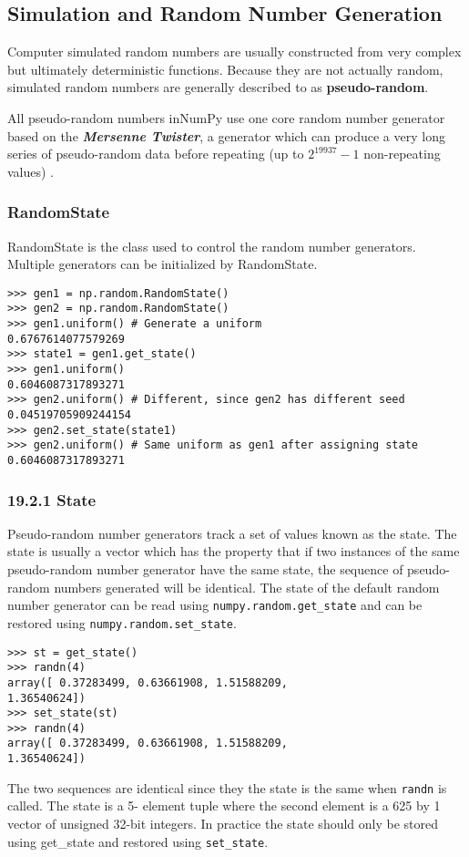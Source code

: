 \documentclass[KSmain.tex]{subfiles}
\begin{document}
\subsection{Simulation and Random Number Generation}
Computer simulated random numbers are usually constructed from very complex but ultimately deterministic
functions. Because they are not actually random, simulated random numbers are generally described
to as \textbf{pseudo-random}. 

All pseudo-random numbers inNumPy use one core random number generator
based on the \textbf{\textit{Mersenne Twister}}, a generator which can produce a very long series of pseudo-random
data before repeating (up to $2^19937 - 1$ non-repeating values)
.
\subsubsection{RandomState}
RandomState is the class used to control the random number generators. Multiple generators can be initialized
by RandomState.
\begin{framed}
\begin{verbatim}
>>> gen1 = np.random.RandomState()
>>> gen2 = np.random.RandomState()
>>> gen1.uniform() # Generate a uniform
0.6767614077579269
>>> state1 = gen1.get_state()
>>> gen1.uniform()
0.6046087317893271
>>> gen2.uniform() # Different, since gen2 has different seed
0.04519705909244154
>>> gen2.set_state(state1)
>>> gen2.uniform() # Same uniform as gen1 after assigning state
0.6046087317893271
\end{verbatim}
\end{framed}
\subsubsection{19.2.1 State}
Pseudo-random number generators track a set of values known as the state. The state is usually a vector
which has the property that if two instances of the same pseudo-random number generator have the
same state, the sequence of pseudo-random numbers generated will be identical. The state of the default
random number generator can be read using \texttt{numpy.random.get\_state} and can be restored using
\texttt{numpy.random.set\_state}.
\begin{framed}
\begin{verbatim}>>> st = get_state()
>>> randn(4)
array([ 0.37283499, 0.63661908, 1.51588209,
1.36540624])
>>> set_state(st)
>>> randn(4)
array([ 0.37283499, 0.63661908, 1.51588209,
1.36540624])
\end{verbatim}
\end{framed}
The two sequences are identical since they the state is the same when \texttt{randn} is called. The state is a 5-
element tuple where the second element is a 625 by 1 vector of unsigned 32-bit integers. In practice the
state should only be stored using get_state and restored using \texttt{set\_state}.
\newpage
\end{document}
